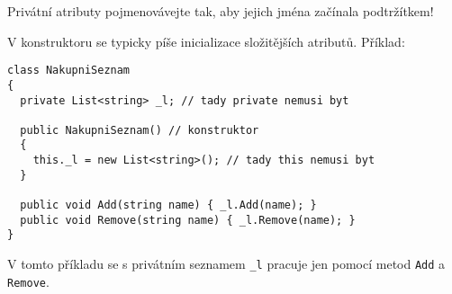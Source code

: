 \documentclass[12pt,a4paper]{article}
\begin{document}
Privátní atributy pojmenovávejte tak, aby jejich jména začínala podtržítkem!

V konstruktoru se typicky píše inicializace složitějších atributů. Příklad:

\begin{verbatim}
class NakupniSeznam
{
  private List<string> _l; // tady private nemusi byt

  public NakupniSeznam() // konstruktor
  {
    this._l = new List<string>(); // tady this nemusi byt
  }

  public void Add(string name) { _l.Add(name); }
  public void Remove(string name) { _l.Remove(name); }
}
\end{verbatim}

V tomto příkladu se s privátním seznamem \texttt{\_l} pracuje jen pomocí metod
\texttt{Add} a \texttt{Remove}.
\end{document}
